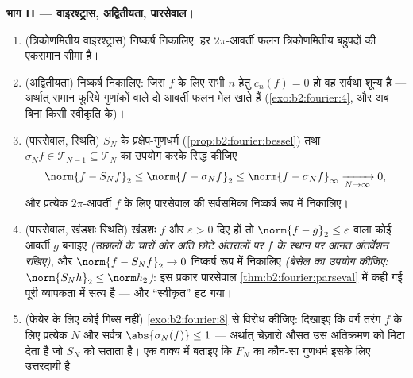 \begin{problem}
\medskip
\noindent\textbf{भाग II --- वाइरश्ट्रास, अद्वितीयता, पारसेवाल।}
\begin{enumerate}[resume]
  \item (त्रिकोणमितीय वाइरश्ट्रास) निष्कर्ष निकालिए: हर  $2\pi$-आवर्ती
        फलन त्रिकोणमितीय बहुपदों की एकसमान सीमा है।
  \item (अद्वितीयता) निष्कर्ष निकालिए: जिस  $f$ के लिए सभी $n$ हेतु
        $c_n(f) = 0$ हो वह सर्वथा शून्य है --- अर्थात् समान फूरिये गुणांकों वाले
        दो  आवर्ती फलन मेल खाते हैं (\cref{exo:b2:fourier:4}, और अब बिना किसी स्वीकृति के)।
  \item (पारसेवाल,  स्थिति) $S_N$ के प्रक्षेप-गुणधर्म (\cref{prop:b2:fourier:bessel}) तथा $\sigma_Nf \in \mathcal T_{N-1} \subseteq \mathcal
        T_N$ का
        उपयोग करके सिद्ध कीजिए
        \[
        \norm{f - S_Nf}_2 \leq \norm{f - \sigma_Nf}_2
        \leq \norm{f - \sigma_Nf}_\infty
        \xrightarrow[N\to\infty]{} 0 ,
        \]
        और प्रत्येक \emph{} $2\pi$-आवर्ती $f$ के लिए पारसेवाल की
        सर्वसमिका निष्कर्ष रूप में निकालिए।
  \item (पारसेवाल, खंडशः  स्थिति) खंडशः  $f$ और $\varepsilon > 0$ दिए हों तो
        $\norm{f - g}_2 \leq
        \varepsilon$ वाला कोई  आवर्ती $g$ बनाइए \emph{(उछालों के चारों ओर
        अति छोटे अंतरालों पर $f$ के स्थान पर आनत अंतर्वेशन रखिए)}, और
        $\norm{f - S_Nf}_2 \to 0$ निष्कर्ष रूप में निकालिए \emph{(बेसेल का उपयोग कीजिए: $\norm{S_Nh}_2 \leq \norm h_2$)}:
        इस प्रकार पारसेवाल \cref{thm:b2:fourier:parseval} में कही गई पूरी व्यापकता में सत्य है ---
        और ``स्वीकृत'' हट गया।
  \item (फेयेर के लिए कोई गिब्स नहीं) \cref{exo:b2:fourier:8} से विरोध कीजिए: दिखाइए कि वर्ग
        तरंग $f$ के लिए प्रत्येक $N$ और सर्वत्र $\abs{\sigma_N(f)} \leq 1$ --- अर्थात्
        चेज़ारो औसत उस अतिक्रमण को मिटा देता है जो $S_N$ को सताता है। एक
        वाक्य में बताइए कि $F_N$ का कौन-सा गुणधर्म इसके लिए उत्तरदायी है।
\end{enumerate}


\end{problem}
